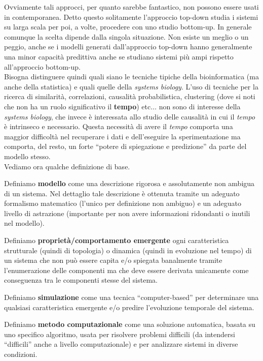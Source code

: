 \documentclass[a4paper,12pt, oneside]{book}
\begin{document}
Ovviamente tali approcci, per quanto sarebbe fantastico, non possono essere
usati in contemporanea. Detto questo solitamente l'approccio top-down studia i
sistemi su larga scala per poi, a volte, procedere con uno studio bottom-up. In
generale comunque la scelta dipende dalla singola situazione. Non esiste un
meglio o un peggio, anche se i modelli generati dall'approccio top-down hanno
generalmente una minor capacità predittiva anche se studiano sistemi più ampi
rispetto all'approccio bottom-up.\\
Bisogna distinguere quindi quali siano le tecniche tipiche della bioinformatica
(ma anche della statistica)
e quali quelle della \textit{systems biology}. L'uso di tecniche per la ricerca
di similarità, correlazioni, causalità probabilistica, clustering (dove si noti
che non ha un ruolo significativo il \textbf{tempo}) etc$\ldots$
non sono di interesse della \textit{systems biology}, che invece è interessata
allo studio delle causalità in cui il \textit{tempo} è intrinseco e
necessario. Questa necessità di avere il \textit{tempo} comporta una maggior
difficoltà nel recuperare i dati e dell'eseguire la sperimentazione ma comporta,
del resto, un forte ``potere di spiegazione e predizione'' da parte del modello
stesso. \\
Vediamo ora qualche definizione di base.
\begin{definizione}
  Definiamo \textbf{modello} come una descrizione rigorosa e assolutamente non
  ambigua di un sistema. Nel dettaglio tale descrizione è ottenuta tramite un
  adeguato formalismo matematico (l'unico per definizione non ambiguo) e un
  adeguato livello di astrazione (importante per non avere informazioni
  ridondanti o inutili nel modello). 
\end{definizione}
\begin{definizione}
  Definiamo \textbf{proprietà/comportamento emergente} ogni
  caratteristica strutturale (quindi di topologia) o dinamica (quindi in
  evoluzione nel tempo) di un sistema che non può essere capita e/o spiegata
  banalmente tramite l'enumerazione delle componenti ma che deve essere derivata
  unicamente come conseguenza tra le componenti stesse del sistema.
\end{definizione}
\begin{definizione}
  Definiamo \textbf{simulazione} come una tecnica ``computer-based'' per
  determinare una qualsiasi caratteristica emergente e/o predire l'evoluzione
  temporale del sistema. 
\end{definizione}
\begin{definizione}
  Definiamo \textbf{metodo computazionale} come una soluzione automatica, basata
  su uno specifico algoritmo, usata per risolvere problemi difficili (da
  intendersi ``difficili'' anche a livello computazionale) e per
  analizzare sistemi in diverse condizioni.
\end{definizione}
\end{document}
